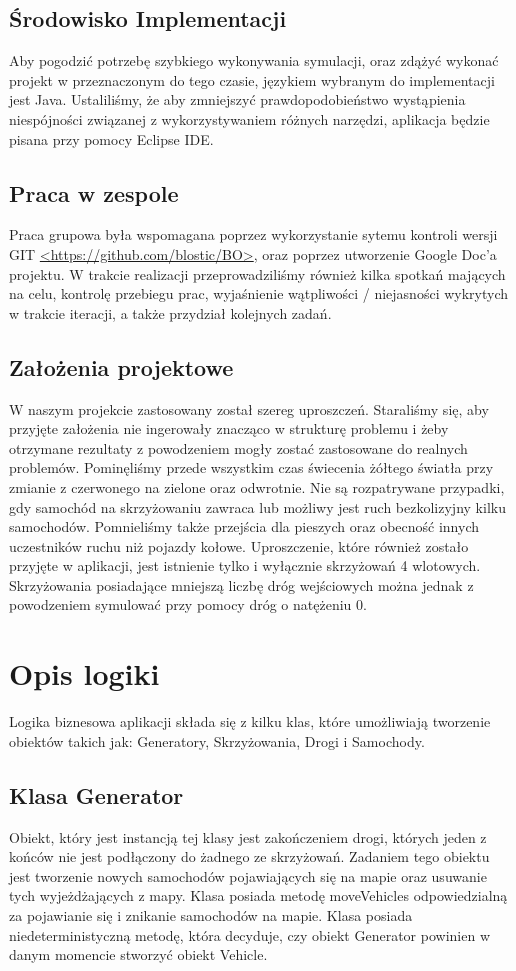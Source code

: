 \documentclass{article}
\begin{document}
\subsection{Środowisko Implementacji}
    Aby pogodzić potrzebę szybkiego wykonywania symulacji, oraz zdążyć wykonać projekt w przeznaczonym do tego czasie, językiem wybranym do implementacji jest Java. Ustaliliśmy, że aby zmniejszyć prawdopodobieństwo wystąpienia niespójności związanej z wykorzystywaniem różnych narzędzi, aplikacja będzie pisana przy pomocy Eclipse IDE. 

\subsection{Praca w zespole}
    Praca grupowa była wspomagana poprzez wykorzystanie sytemu kontroli wersji GIT \url{<https://github.com/blostic/BO>}, oraz poprzez utworzenie Google Doc'a projektu. W trakcie realizacji przeprowadziliśmy również kilka spotkań mających na celu, kontrolę przebiegu prac, wyjaśnienie wątpliwości / niejasności wykrytych w trakcie iteracji, a także przydział kolejnych zadań.


\subsection{Założenia projektowe}
    W naszym projekcie zastosowany został szereg uproszczeń. Staraliśmy się, aby przyjęte założenia nie ingerowały znacząco w strukturę problemu i żeby otrzymane rezultaty z powodzeniem mogły zostać zastosowane do realnych problemów. Pominęliśmy przede wszystkim czas świecenia żółtego światła przy zmianie z czerwonego na zielone oraz odwrotnie. Nie są rozpatrywane przypadki, gdy samochód na skrzyżowaniu zawraca lub możliwy jest ruch bezkolizyjny kilku samochodów. Pomnieliśmy także przejścia dla pieszych oraz obecność innych uczestników ruchu niż pojazdy kołowe. Uproszczenie, które również zostało przyjęte w aplikacji, jest istnienie tylko i wyłącznie skrzyżowań 4 wlotowych. Skrzyżowania posiadające mniejszą liczbę dróg wejściowych można jednak z powodzeniem symulować przy pomocy dróg o natężeniu 0.
\section{Opis logiki}
  Logika biznesowa aplikacji składa się z kilku klas, które umożliwiają tworzenie obiektów takich jak: Generatory, Skrzyżowania, Drogi i Samochody. 

\subsection{Klasa Generator}
    Obiekt, który jest instancją tej klasy jest zakończeniem drogi, których jeden z końców nie jest podłączony do żadnego ze skrzyżowań. Zadaniem tego obiektu jest tworzenie nowych samochodów pojawiających się na mapie oraz usuwanie tych wyjeżdżających z mapy. Klasa posiada metodę moveVehicles odpowiedzialną za pojawianie się i znikanie samochodów na mapie. Klasa posiada  niedeterministyczną metodę, która decyduje, czy obiekt Generator powinien w danym momencie stworzyć obiekt Vehicle.
\end{document}
